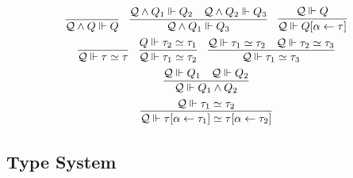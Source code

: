 \begin{gather*}
  \infer{\mathcal{Q} \land Q \Vdash Q}{}
  \hspace{1em}
  \infer{\mathcal{Q} \land Q_1 \Vdash Q_3}{
    \mathcal{Q} \land Q_1 \Vdash Q_2
    &
    \mathcal{Q} \land Q_2 \Vdash Q_3
  }
  \hspace{1em}
  \infer{\mathcal{Q} \Vdash Q[\alpha \assign \tau]}{
    \mathcal{Q} \Vdash Q
  }
  \\
  \infer{\mathcal{Q} \Vdash \tau \simeq \tau}{}
  \hspace{1em}
  \infer{\mathcal{Q} \Vdash \tau_1 \simeq \tau_2}{
    Q \Vdash \tau_2 \simeq \tau_1
  }
  \hspace{1em}
  \infer{\mathcal{Q} \Vdash \tau_1 \simeq \tau_3}{
    \mathcal{Q} \Vdash \tau_1 \simeq \tau_2
    &
    \mathcal{Q} \Vdash \tau_2 \simeq \tau_3
  }
  \\
  \infer{\mathcal{Q} \Vdash Q_1 \land Q_2}{
    \mathcal{Q} \Vdash Q_1
    &
    \mathcal{Q} \Vdash Q_2
  }
  \\
  \infer{\mathcal{Q} \Vdash \tau[\alpha \assign \tau_1] \simeq \tau[\alpha \assign \tau_2]}{
    \mathcal{Q} \Vdash \tau_1 \simeq \tau_2
  }
\end{gather*}

\subsection{Type System}

